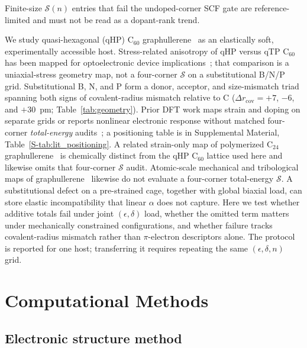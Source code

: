 \documentclass[%
 reprint,
 groupedaddress,
 amsmath,amssymb,
 aps,
 prb,
 floatfix,
]{revtex4-2}
\begin{document}
Finite-size $\mathcal{S}(n)$ entries that fail the undoped-corner SCF gate are reference-limited and must not be read as a dopant-rank trend.

We study quasi-hexagonal (qHP) C$_{60}$ graphullerene~\cite{Hou2022synthesis,Capobianco2024electron,Makov2023graphullerene} as an elastically soft, experimentally accessible host.
Stress-related anisotropy of qHP versus qTP C$_{60}$ has been mapped for optoelectronic device implications~\cite{Wang2024simulation}; that comparison is a uniaxial-stress geometry map, not a four-corner $\mathcal{S}$ on a substitutional B/N/P grid.
Substitutional B, N, and P form a donor, acceptor, and size-mismatch triad spanning both signs of covalent-radius mismatch relative to C ($\Delta r_{\mathrm{cov}}=+7$, $-6$, and $+30$~pm; Table~\ref{tab:geometry}).
Prior DFT work maps strain and doping on separate grids or reports nonlinear electronic response without matched four-corner \emph{total-energy} audits~\cite{Li2024strain,Khan2025tuning,Peng2025monolayer,Capobianco2024electron,Tromer2022dft,Lee2023localised,Silva2024large,Santra2024strain}; a positioning table is in Supplemental Material, Table~\ref{S-tab:lit_positioning}.
A related strain-only map of polymerized C$_{24}$ graphullerene~\cite{Li2024graphullerene} is chemically distinct from the qHP C$_{60}$ lattice used here and likewise omits that four-corner $\mathcal{S}$ audit.
Atomic-scale mechanical and tribological maps of graphullerene~\cite{Qiu2025atomic} likewise do not evaluate a four-corner total-energy $\mathcal{S}$.
A substitutional defect on a pre-strained cage, together with global biaxial load, can store elastic incompatibility that linear $\alpha$ does not capture.
Here we test whether additive totals fail under joint $(\epsilon,\delta)$ load, whether the omitted term matters under mechanically constrained configurations, and whether failure tracks covalent-radius mismatch rather than $\pi$-electron descriptors alone.
The protocol is reported for one host; transferring it requires repeating the same $(\epsilon,\delta,n)$ grid.

\section{\label{sec:methods}Computational Methods}

\subsection{Electronic structure method}
\end{document}
